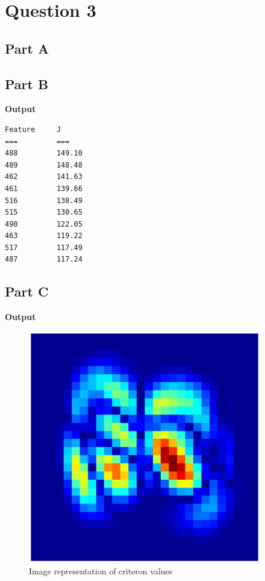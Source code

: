 \documentclass{article}
\begin{document}
\section*{Question 3}
\subsection*{Part A}

\subsection*{Part B}


\textbf{Output}
\begin{lstlisting}
Feature		J
===			===
488			149.10 
489			148.48 
462			141.63 
461			139.66 
516			138.49 
515			130.65 
490			122.05 
463			119.22 
517			117.49 
487			117.24 
\end{lstlisting}
\pagebreak
\subsection*{Part C}

\textbf{Output}
\begin{figure}[H]
\centering
\includegraphics[width=4in]{ass2Code/3c.eps}
\caption{Image representation of criteron values}
\end{figure}
\end{document}
